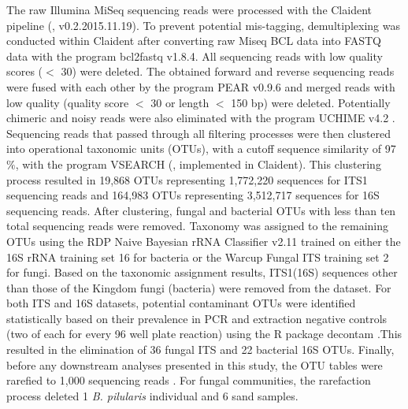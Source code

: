 The raw Illumina MiSeq sequencing reads were processed with the Claident pipeline (\citealp{Tanabe2013}, v0.2.2015.11.19). To prevent potential mis-tagging, demultiplexing was conducted within Claident after converting raw Miseq BCL data into FASTQ data with the program bcl2fastq v1.8.4. All sequencing reads with low quality scores ($<$ 30) were deleted. The obtained forward and reverse sequencing reads were fused with each other by the program PEAR v0.9.6 \citep{Zhang2014} and merged reads with low quality (quality score $<$ 30 or length $<$ 150 bp) were deleted. Potentially chimeric and noisy reads were also eliminated with the program UCHIME v4.2 \citep{Edgar2011}. Sequencing reads that passed through all filtering processes were then clustered into operational taxonomic units (OTUs), with a cutoff sequence similarity of 97$\%$, with the program VSEARCH (\citealp{Rognes2016}, implemented in Claident). This clustering process resulted in 19,868 OTUs representing 1,772,220 sequences for ITS1 sequencing reads and 164,983 OTUs representing 3,512,717 sequences for 16S sequencing reads. After clustering, fungal and bacterial OTUs with less than ten total sequencing reads were removed. Taxonomy was assigned to the remaining OTUs using the RDP Naive Bayesian rRNA Classifier v2.11 \citep{Wang2007} trained on either the 16S rRNA training set 16 for bacteria or the Warcup Fungal ITS training set 2 \citep{Deshpande2016} for fungi. Based on the taxonomic assignment results, ITS1(16S) sequences other than those of the Kingdom fungi (bacteria) were removed from the dataset. For both ITS and 16S datasets, potential contaminant OTUs were identified statistically based on their prevalence in PCR and extraction negative controls (two of each for every 96 well plate reaction) using the R package decontam \citep{Davis2018}.This resulted in the elimination of 36 fungal ITS and 22 bacterial 16S OTUs. Finally, before any downstream analyses presented in this study, the OTU tables were rarefied to 1,000 sequencing reads \citep{McMurdie2013}. For fungal communities, the rarefaction process deleted 1 \textit{B. pilularis} individual and 6 sand samples.
\par



